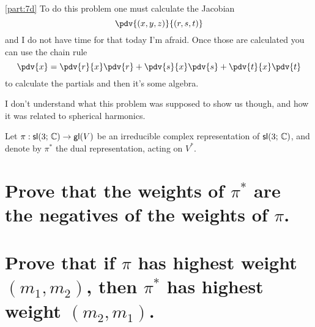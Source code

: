 \documentclass[
	pages,
	boxes,
	color=WildStrawberry
]{homework}
\begin{document}
\begin{solution}
	\ref{part:7d}
	To do this problem one must calculate the Jacobian
	\begin{equation*}
		\pdv{(x, y, z)}{(r, s, t)}
	\end{equation*}
	and I do not have time for that today I'm afraid. Once those are calculated you can use the chain rule
	\begin{equation*}
		\pdv{x} = \pdv{r}{x}\pdv{r} + \pdv{s}{x}\pdv{s} + \pdv{t}{x}\pdv{t}
	\end{equation*}
	to calculate the partials and then it's some algebra.

	I don't understand what this problem was supposed to show us though, and how it was related to spherical harmonics.
\end{solution}

\begin{problem}
Let $\pi: \mathsf{sl}(3;\, \mathbb{C}) \to \mathsf{gl}(V)$ be an irreducible complex representation of $\mathsf{sl}(3;\, \mathbb{C})$, and denote by $\pi^*$ the dual representation, acting on $V^*$.
\begin{parts}
	\part{Prove that the weights of $\pi^*$ are the negatives of the weights of $\pi$.}\label{part:8a}
	\part{Prove that if $\pi$ has highest weight $(m_1, m_2)$, then $\pi^*$ has highest weight $(m_2, m_1)$.}\label{part:8b}
\end{parts}
\end{problem}
\end{document}
